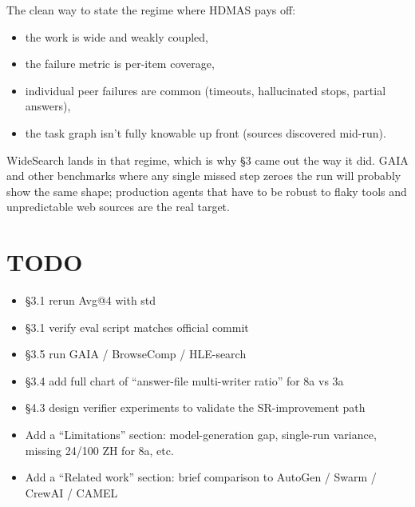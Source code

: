 \documentclass[11pt]{article}
\begin{document}
The clean way to state the regime where HDMAS pays off:
\begin{itemize}[leftmargin=1.2em]
  \item the work is wide and weakly coupled,
  \item the failure metric is per-item coverage,
  \item individual peer failures are common (timeouts, hallucinated stops, partial answers),
  \item the task graph isn't fully knowable up front (sources discovered mid-run).
\end{itemize}

WideSearch lands in that regime, which is why \S3 came out the way it did. GAIA and other benchmarks where any single missed step zeroes the run will probably show the same shape; production agents that have to be robust to flaky tools and unpredictable web sources are the real target.

\section*{TODO}

\begin{itemize}[leftmargin=1.5em, label=$\square$]
  \item \S3.1 rerun Avg@4 with std
  \item \S3.1 verify eval script matches official commit
  \item \S3.5 run GAIA / BrowseComp / HLE-search
  \item \S3.4 add full chart of ``answer-file multi-writer ratio'' for 8a vs 3a
  \item \S4.3 design verifier experiments to validate the SR-improvement path
  \item Add a ``Limitations'' section: model-generation gap, single-run variance, missing 24/100 ZH for 8a, etc.
  \item Add a ``Related work'' section: brief comparison to AutoGen / Swarm / CrewAI / CAMEL
\end{itemize}
\end{document}
